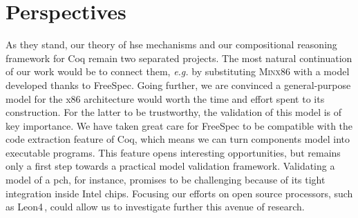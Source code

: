 \section{Perspectives}
\label{sec:conclusion:perspectives}

As they stand, our theory of \ac{hse} mechanisms and our compositional reasoning
framework for Coq remain two separated projects.
%
The most natural continuation of our work would be to connect them, \emph{e.g.}
by substituting {\scshape Minx86} with a model developed thanks to FreeSpec.
%
Going further, we are convinced a general-purpose model for the x86 architecture
would worth the time and effort spent to its construction.
%
For the latter to be trustworthy, the validation of this model is of key
importance.
%
We have taken great care for FreeSpec to be compatible with the code extraction
feature of Coq, which means we can turn components model into executable
programs.
%
This feature opens interesting opportunities, but remains only a first step
towards a practical model validation framework.
%
Validating a model of a \ac{pch}, for instance, promises to be challenging
because of its tight integration inside Intel chips.
%
Focusing our efforts on open source processors, such as
Leon4\,\cite{gaisler2007leon}, could allow us to investigate further this avenue
of research.
